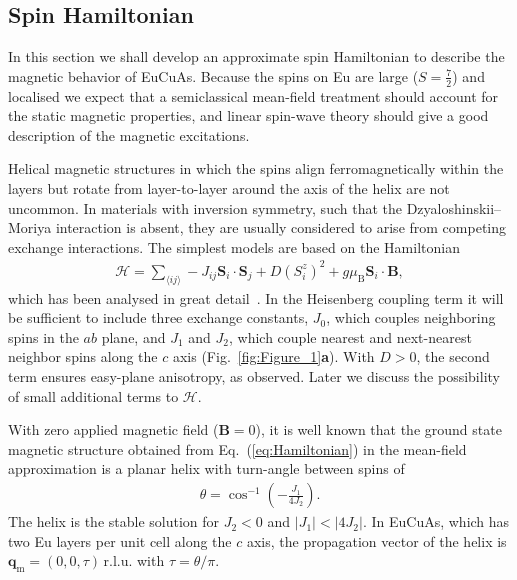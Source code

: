 \documentclass[aps,prl,amsmath,amssymb,amstext,citeautoscript,punctuation,nofootinbib,superscriptaddress,twocolumn]{revtex4-1}
\begin{document}
\subsection{Spin Hamiltonian}

In this section we shall develop an approximate spin Hamiltonian to describe the magnetic behavior of EuCuAs. Because the spins on Eu are large ($S=\frac{7}{2}$) and localised we expect that a semiclassical mean-field treatment should account for the static magnetic properties, and linear spin-wave theory should give a good description of the magnetic excitations.

Helical magnetic structures in which the spins align ferromagnetically within the layers but rotate from layer-to-layer around the axis of the helix are not uncommon. In materials with inversion symmetry, such that the Dzyaloshinskii--Moriya interaction is absent, they are usually considered to arise from competing exchange interactions. The simplest models are based on the Hamiltonian
\begin{align}
\mathcal{H} = \sum_{\langle ij\rangle} -J_{ij}\textbf{S}_i\cdot \textbf{S}_j + D(S_i^z)^2 + g\mu_\textrm{B}\textbf{S}_i\cdot \textbf{B},
\label{eq:Hamiltonian}
\end{align}
which has been analysed in great detail~\cite{Yoshimori1959,Nagamiya1962,Kitano1964,Nagamiya1967,Robinson1970,Johnston2017}. In the Heisenberg coupling term it will be sufficient to include three exchange constants, $J_0$, which couples neighboring spins in the $ab$ plane, and $J_1$ and $J_2$, which couple nearest and next-nearest neighbor spins along the $c$ axis (Fig.~\ref{fig:Figure_1}\textbf{a}). With $D>0$, the second term ensures easy-plane anisotropy, as observed. Later we discuss the possibility of small additional terms to $\mathcal{H}$.

 With zero applied magnetic field ($\textbf{B} = 0$), it is well known that the ground state magnetic structure obtained from Eq.~(\ref{eq:Hamiltonian}) in the mean-field approximation is a planar helix with turn-angle between spins of 
  \begin{align}
     \theta = \cos^{-1}\left(-\frac{J_1}{4J_2}\right).
    \label{eq:helix-prop-vec} 
    \end{align}
The helix is the stable solution for $J_2 < 0$ and $|J_1| < |4J_2|$. In EuCuAs, which has two Eu layers per unit cell along the $c$ axis, the  propagation vector of the helix is $\textbf{q}_\textrm{m} = (0,0,\tau)$\,r.l.u. with $\tau = \theta/\pi$.
\end{document}
